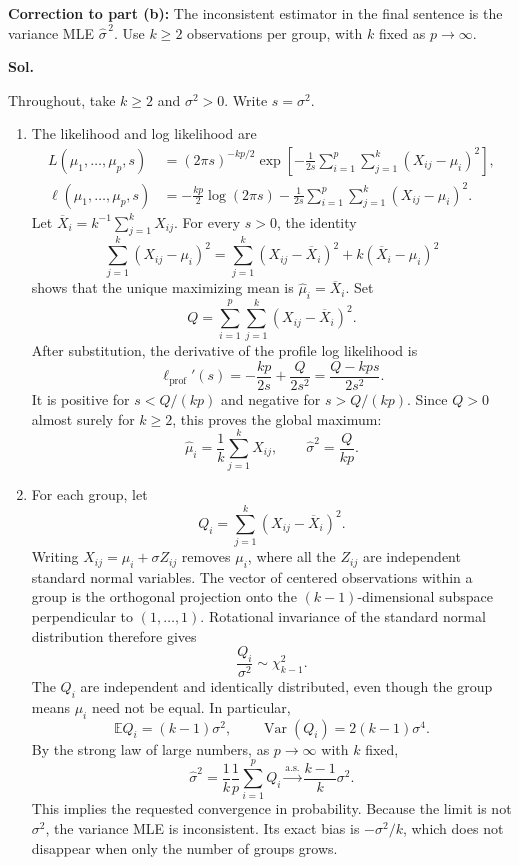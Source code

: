 \documentclass[lang=en,11pt,a4paper,citestyle=authoryear]{elegantpaper}
\newcommand{\E}{\mathbb{E}}
\begin{document}
\medskip
\noindent\textbf{Correction to part (b):}
The inconsistent estimator in the final sentence is the variance MLE
$\widehat{\sigma}^{\,2}$. Use $k\ge2$ observations per group, with $k$
fixed as $p\to\infty$.

\par\vspace{0.5em}\noindent\textbf{Sol.}\par
Throughout, take $k\ge2$ and $\sigma^2>0$. Write $s=\sigma^2$.
\begin{enumerate}[label=(\alph*),leftmargin=*]
\item The likelihood and log likelihood are
\[
\begin{aligned}
L(\mu_1,\ldots,\mu_p,s)
&=(2\pi s)^{-kp/2}
\exp\left[-\frac1{2s}\sum_{i=1}^p\sum_{j=1}^k
(X_{ij}-\mu_i)^2\right],\\
\ell(\mu_1,\ldots,\mu_p,s)
&=-\frac{kp}{2}\log(2\pi s)
-\frac1{2s}\sum_{i=1}^p\sum_{j=1}^k(X_{ij}-\mu_i)^2.
\end{aligned}
\]
Let $\overline X_i=k^{-1}\sum_{j=1}^kX_{ij}$.
For every $s>0$, the identity
\[
\sum_{j=1}^k(X_{ij}-\mu_i)^2
=\sum_{j=1}^k(X_{ij}-\overline X_i)^2
+k(\overline X_i-\mu_i)^2
\]
shows that the unique maximizing mean is
$\widehat\mu_i=\overline X_i$.
Set
\[
Q=\sum_{i=1}^p\sum_{j=1}^k(X_{ij}-\overline X_i)^2.
\]
After substitution, the derivative of the profile log likelihood is
\[
\ell_{\mathrm{prof}}'(s)
=-\frac{kp}{2s}+\frac{Q}{2s^2}
=\frac{Q-kps}{2s^2}.
\]
It is positive for $s<Q/(kp)$ and negative for $s>Q/(kp)$.
Since $Q>0$ almost surely for $k\ge2$, this proves the global maximum:
\[
\boxed{\widehat\mu_i=\frac1k\sum_{j=1}^kX_{ij},\qquad
\widehat\sigma^2=\frac Q{kp}.}
\]

\item For each group, let
\[
Q_i=\sum_{j=1}^k(X_{ij}-\overline X_i)^2.
\]
Writing $X_{ij}=\mu_i+\sigma Z_{ij}$ removes $\mu_i$, where all the
$Z_{ij}$ are independent standard normal variables. The vector of
centered observations within a group is the orthogonal projection
onto the $(k-1)$-dimensional subspace perpendicular to $(1,\ldots,1)$.
Rotational invariance of the standard normal distribution therefore gives
\[
\frac{Q_i}{\sigma^2}\sim\chi_{k-1}^2.
\]
The $Q_i$ are independent and identically distributed, even though
the group means $\mu_i$ need not be equal. In particular,
\[
\E Q_i=(k-1)\sigma^2,\qquad
\operatorname{Var}(Q_i)=2(k-1)\sigma^4.
\]
By the strong law of large numbers, as $p\to\infty$ with $k$ fixed,
\[
\widehat\sigma^2
=\frac1k\frac1p\sum_{i=1}^pQ_i
\xrightarrow{\mathrm{a.s.}}\frac{k-1}{k}\sigma^2.
\]
This implies the requested convergence in probability. Because the
limit is not $\sigma^2$, the variance MLE is inconsistent.
Its exact bias is $-\sigma^2/k$, which does not disappear when
only the number of groups grows.


\end{enumerate}
\end{document}
